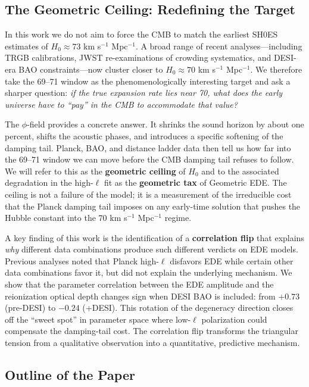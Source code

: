 \documentclass[a4paper,11pt]{article}
\begin{document}
\subsection{The Geometric Ceiling: Redefining the Target}

In this work we do not aim to force the CMB to match the earliest SH0ES estimates of $H_0 \approx 73$ km s$^{-1}$ Mpc$^{-1}$. A broad range of recent analyses---including TRGB calibrations, JWST re-examinations of crowding systematics, and DESI-era BAO constraints---now cluster closer to $H_0 \approx 70$ km s$^{-1}$ Mpc$^{-1}$. We therefore take the 69--71 window as the phenomenologically interesting target and ask a sharper question: \emph{if the true expansion rate lies near 70, what does the early universe have to ``pay'' in the CMB to accommodate that value?}

The $\phi$-field provides a concrete answer. It shrinks the sound horizon by about one percent, shifts the acoustic phases, and introduces a specific softening of the damping tail. Planck, BAO, and distance ladder data then tell us how far into the 69--71 window we can move before the CMB damping tail refuses to follow. We will refer to this as the \textbf{geometric ceiling} of $H_0$ and to the associated degradation in the high-$\ell$ fit as the \textbf{geometric tax} of Geometric EDE. The ceiling is not a failure of the model; it is a measurement of the irreducible cost that the Planck damping tail imposes on any early-time solution that pushes the Hubble constant into the 70 km s$^{-1}$ Mpc$^{-1}$ regime.

A key finding of this work is the identification of a \textbf{correlation flip} that explains \emph{why} different data combinations produce such different verdicts on EDE models. Previous analyses noted that Planck high-$\ell$ disfavors EDE while certain other data combinations favor it, but did not explain the underlying mechanism. We show that the parameter correlation between the EDE amplitude and the reionization optical depth changes sign when DESI BAO is included: from $+0.73$ (pre-DESI) to $-0.24$ (+DESI). This rotation of the degeneracy direction closes off the ``sweet spot'' in parameter space where low-$\ell$ polarization could compensate the damping-tail cost. The correlation flip transforms the triangular tension from a qualitative observation into a quantitative, predictive mechanism.

\subsection{Outline of the Paper}
\end{document}
